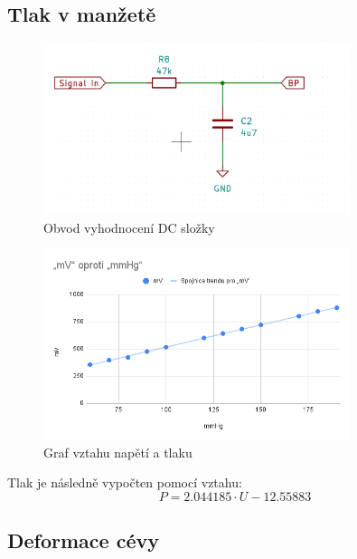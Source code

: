 \documentclass[a4paper,10pt]{article}
\begin{document}
\subsection{Tlak v manžetě}
\begin{figure}[H]
\centering
\includegraphics[width=0.8\textwidth]{dc}
\caption{Obvod vyhodnocení DC složky}
\end{figure}
\begin{figure}[H]
\centering
\includegraphics[width=0.8\textwidth]{mmHg}
\caption{Graf vztahu napětí a tlaku}
\end{figure}

Tlak je následně vypočten pomocí vztahu:
\begin{equation}
 P = 2.044185 \cdot U -12.55883
\end{equation}

\subsection{Deformace cévy}
\end{document}
